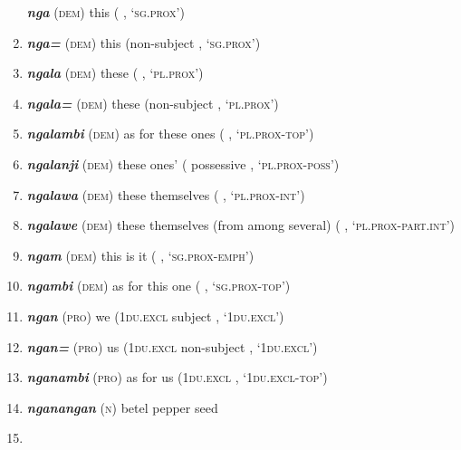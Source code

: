 \begin{enumerate}[noitemsep, label={}, align=left, widest=190, labelsep=1ex,leftmargin=*,itemindent=-10pt]
\textbf{\textit{nga}} (\textsc{dem}) this (  , ‘\textsc{sg.prox}’) \item 
\textbf{\textit{nga=}} (\textsc{dem}) this (non-subject   , ‘\textsc{sg.prox}’) \item 
\textbf{\textit{ngala}} (\textsc{dem}) these (  , ‘\textsc{pl.prox}’) \item 
\textbf{\textit{ngala=}} (\textsc{dem}) these (non-subject   , ‘\textsc{pl.prox}’) \item 
\textbf{\textit{ngalambi}} (\textsc{dem}) as for these ones (   , ‘\textsc{pl.prox-top}’) \item 
\textbf{\textit{ngalanji}} (\textsc{dem}) these ones’ (  possessive , \linebreak‘\textsc{pl.prox-poss}’) \item \textbf{\textit{ngalawa}} (\textsc{dem}) these themselves (   , \linebreak‘\textsc{pl.prox-int}’) \item 
\textbf{\textit{ngalawe}} (\textsc{dem}) these themselves (from among several) (  \linebreak {} , ‘\textsc{pl.prox-part.int}’) \item 
\textbf{\textit{ngam}} (\textsc{dem}) this is it (   , \linebreak‘\textsc{sg.prox-emph}’) \item 
\textbf{\textit{ngambi}} (\textsc{dem}) as for this one (   , ‘\textsc{sg.prox-top}’) \item 
\textbf{\textit{ngan}} (\textsc{pro}) we (\textsc{1du.excl} subject , ‘\textsc{1du.excl}’) \item 
\textbf{\textit{ngan=}} (\textsc{pro}) us \textsc{(1du.excl} non-subject , ‘\textsc{1du.excl}’) \item 
\textbf{\textit{nganambi}} (\textsc{pro}) as for us (\textsc{1du.excl} , ‘\textsc{1du.excl-top}’) \item 
\textbf{\textit{nganangan}} (\textsc{n}) betel pepper seed \item 

\end{enumerate}
